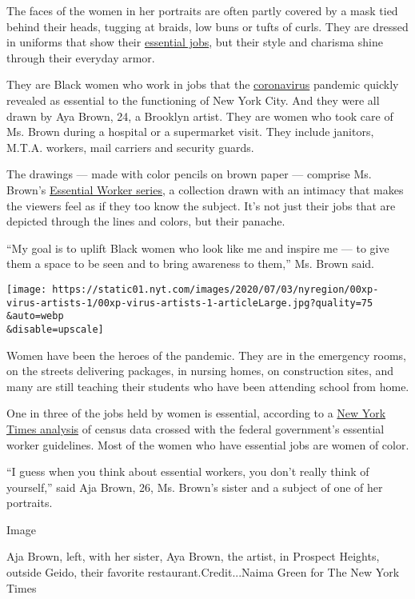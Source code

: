The faces of the women in her portraits are often partly covered by a
mask tied behind their heads, tugging at braids, low buns or tufts of
curls. They are dressed in uniforms that show their
\href{https://www.nytimes.com/2020/07/14/business/coronavirus-essential-workers-pay-raises.html}{essential
jobs}, but their style and charisma shine through their everyday armor.

They are Black women who work in jobs that the
\href{https://www.nytimes.com/2020/07/14/business/coronavirus-essential-workers-pay-raises.html}{coronavirus}
pandemic quickly revealed as essential to the functioning of New York
City. And they were all drawn by Aya Brown, 24, a Brooklyn artist. They
are women who took care of Ms. Brown during a hospital or a supermarket
visit. They include janitors, M.T.A. workers, mail carriers and security
guards.

The drawings --- made with color pencils on brown paper --- comprise Ms.
Brown's \href{http://ayabrown.com/series/Essential\%20Workers}{Essential
Worker series}, a collection drawn with an intimacy that makes the
viewers feel as if they too know the subject. It's not just their jobs
that are depicted through the lines and colors, but their panache.

``My goal is to uplift Black women who look like me and inspire me ---
to give them a space to be seen and to bring awareness to them,'' Ms.
Brown said.

\texttt{[image: https://static01.nyt.com/images/2020/07/03/nyregion/00xp-virus-artists-1/00xp-virus-artists-1-articleLarge.jpg?quality=75\\\&auto=webp\\\&disable=upscale]}

Women have been the heroes of the pandemic. They are in the emergency
rooms, on the streets delivering packages, in nursing homes, on
construction sites, and many are still teaching their students who have
been attending school from home.

One in three of the jobs held by women is essential, according to a
\href{https://www.nytimes.com/2020/04/18/us/coronavirus-women-essential-workers.html}{New
York Times analysis} of census data crossed with the federal
government's essential worker guidelines. Most of the women who have
essential jobs are women of color.

``I guess when you think about essential workers, you don't really think
of yourself,'' said Aja Brown, 26, Ms. Brown's sister and a subject of
one of her portraits.

Image

Aja Brown, left, with her sister, Aya Brown, the artist, in Prospect
Heights, outside Geido, their favorite restaurant.Credit...Naima Green
for The New York Times

